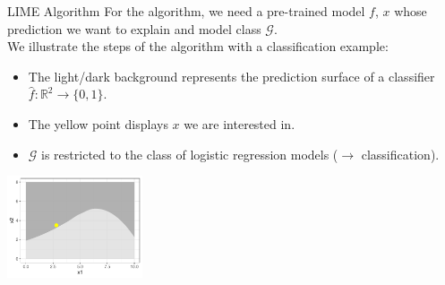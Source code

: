 \documentclass[aspectratio=169]{../latex_main/tntbeamer}  %
\begin{document}
\begin{frame}{LIME Algorithm }
    \vspace{-1em}
		For the algorithm, we need a pre-trained model $f$, $x$ whose prediction we want to explain and model class $\mathcal{G}$.\\ \vspace{0.5cm}
		We illustrate the steps of the algorithm with a classification example: 
		\begin{itemize}
			\item The light/dark background represents the prediction surface of a \alert{classifier} $\hat{f}: \mathbb{R}^2 \to \{0, 1\}$.
			\item The yellow point displays $x$ we are interested in. 
			\item $\mathcal{G}$ is restricted to the class of logistic regression models ($\to$ classification). 
		\end{itemize}
		\begin{center}
			\includegraphics[width=0.3\textwidth]{figure/lime2}
		\end{center}

\end{frame}
\end{document}
